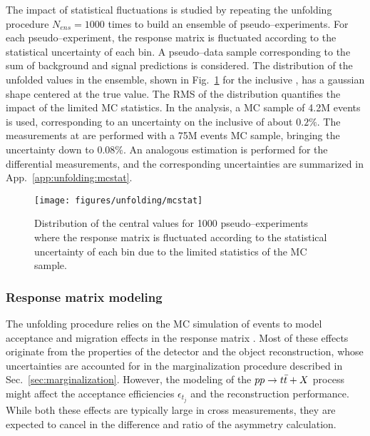 The impact of statistical fluctuations is studied by repeating the
unfolding procedure $N_{ens}=1000$ times to build an ensemble of
pseudo--experiments. For each pseudo--experiment, the response matrix
is fluctuated according to the statistical uncertainty of each bin. A
pseudo--data sample corresponding to the sum of background and signal
predictions is considered. The distribution of the unfolded \ac{}
values in the ensemble, shown in Fig.~\ref{fig:mcstat} for the
inclusive \ac{} \eighttev{}, has a gaussian shape centered at the
true \ac{} value. The RMS of the distribution quantifies the impact
of the limited MC statistics. In the \seventev{} analysis, a MC sample
of 4.2M \ttbar{} events is used, corresponding to an uncertainty on the
inclusive \ac{} of about $0.2\%$. The measurements at \eighttev{} are
performed with a 75M events MC sample, bringing the uncertainty down to
$0.08\%$. An analogous estimation is performed for the differential
measurements, and the corresponding uncertainties are summarized in
App.~\ref{app:unfolding:mcstat}.

\begin{figure}[!htb]\centering
  \texttt{[image: figures/unfolding/mcstat]}
  \caption{Distribution of the \ac{} central values for 1000
    pseudo--experiments where the response matrix is fluctuated
    according to the statistical uncertainty of each bin due to the
    limited statistics of the MC sample.}
  \label{fig:mcstat}
\end{figure}

\subsubsection{Response matrix modeling}

The unfolding procedure relies on the MC simulation of \ttbar{} events
to model acceptance and migration effects in the response matrix
\TrasfMatrix{}. Most of these effects originate from the properties of
the detector and the object reconstruction, whose uncertainties are
accounted for in the marginalization procedure described in
Sec.~\ref{sec:marginalization}. However, the modeling of the
$pp\to t\bar{t}{}+X$ process might affect the acceptance efficiencies
$\epsilon_{t_j}$ and the reconstruction performance. While both these
effects are typically large in cross measurements, they are expected
to cancel in the difference and ratio of the asymmetry calculation.

